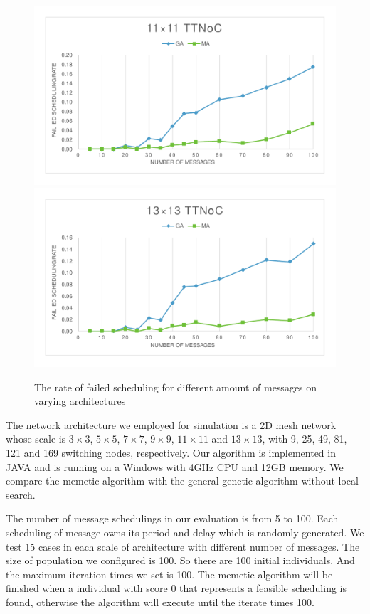 \documentclass[10pt,journal]{IEEEtran}
\theoremstyle{remark}
\begin{document}
\begin{figure}[!t]
	{\includegraphics[width=\wid in]{picture/11TTNOC}}
	{\includegraphics[width=\wid in]{picture/13TTNOC}}
	\caption{The rate of failed scheduling for different amount of messages on varying architectures}
	\label{f:fail}
\end{figure}
The network architecture we employed for simulation is a 2D mesh network whose scale is $3\times 3$, $5\times 5$, $7\times 7$, $9\times 9$, $11\times 11$ and $13\times 13$,
 with 9, 25, 49, 81, 121 and 169 switching nodes, respectively.
Our algorithm is implemented in JAVA and is running on a Windows with 4GHz CPU and 12GB memory.
We compare the memetic algorithm with the general genetic algorithm without local search. 

The number of message schedulings in our evaluation is from 5 to 100.
Each scheduling of message owns its period and delay which is randomly generated.
We test 15 cases in each scale of architecture with different number of messages.
The size of population we configured is 100.
So there are 100 initial individuals.
And the maximum iteration times we set is 100.
The memetic algorithm will be finished when a individual with score 0 that represents a feasible scheduling is found,
 otherwise the algorithm will execute until the iterate times 100.
\end{document}
